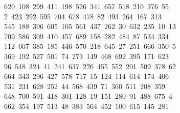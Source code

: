 \begin{tabbing}
\>\ 620\ 108\ 299\ 411\ 198\ 526\ 341\ 657\ 518\ 210\ 376\ 55\ \\[0pt]
\ 2\ 423\ 292\ 595\ 704\ 678\ 478\ 82\ 493\ 264\ 167\ 313\\[0pt]
\>\ 545\ 188\ 396\ 605\ 105\ 561\ 437\ 262\ 30\ 632\ 235\ 10\ 13\\[0pt]
\ 709\ 586\ 309\ 410\ 457\ 689\ 158\ 282\ 484\ 87\ 534\ 334\\[0pt]
\>\ 112\ 607\ 385\ 185\ 446\ 570\ 218\ 645\ 27\ 251\ 666\ 350\ 5\\[0pt]
\ 369\ 192\ 527\ 501\ 74\ 273\ 149\ 468\ 692\ 395\ 171\ 623\\[0pt]
\>\ 96\ 548\ 324\ 41\ 241\ 637\ 226\ 455\ 552\ 201\ 509\ 378\ 62\\[0pt]
\>\ 664\ 343\ 296\ 427\ 578\ 717\ 15\ 124\ 114\ 614\ 174\ 406\ \\[0pt]
\ 531\ 231\ 628\ 252\ 44\ 568\ 439\ 71\ 360\ 511\ 208\ 359\\[0pt]
\>\ 648\ 700\ 591\ 418\ 301\ 128\ 19\ 151\ 280\ 91\ 488\ 675\ 4\\[0pt]
\ 662\ 354\ 197\ 513\ 48\ 383\ 564\ 452\ 100\ 615\ 145\ 281\\[0pt]

\end{tabbing}
